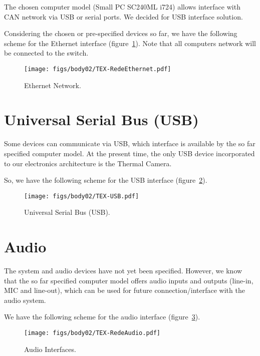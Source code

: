 The chosen computer model (Small PC SC240ML i724) allows interface with CAN network via USB or serial ports. We decided for USB interface solution.

Considering the chosen or pre-specified devices so far, we have the following scheme for the Ethernet interface (figure~\ref{FIG:ETHERNETNETWORK}). Note that all computers network will be connected to the switch.
\begin{figure}[H]
  \centering
  \texttt{[image: figs/body02/TEX-RedeEthernet.pdf]}\\
  \caption[Ethernet Network]{Ethernet Network.}
  \label{FIG:ETHERNETNETWORK}
\end{figure}
\newpage
\section{Universal Serial Bus (USB)}
Some devices can communicate via USB, which interface is available by the so far specified computer model. At the present time, the only USB device incorporated to our electronics architecture is the Thermal Camera.

So, we have the following scheme for the USB interface (figure~\ref{FIG:INTERFACEUSB}).
\begin{figure}[H]
  \centering
  \texttt{[image: figs/body02/TEX-USB.pdf]}\\
  \caption[Universal Serial Bus (USB)]{Universal Serial Bus (USB).}
  \label{FIG:INTERFACEUSB}
\end{figure}\newpage
\section{Audio}
The system and audio devices have not yet been specified. However, we know that the so far specified computer model offers audio inputs and outputs (line-in, MIC and line-out), which can be used for future connection/interface with the audio system.

We have the following scheme for the audio interface (figure~\ref{FIG:INTERFACEAUDIO}).
\begin{figure}[H]
  \centering
  \texttt{[image: figs/body02/TEX-RedeAudio.pdf]}\\
  \caption[Audio Interface]{Audio Interfaces.}
  \label{FIG:INTERFACEAUDIO}
\end{figure}

